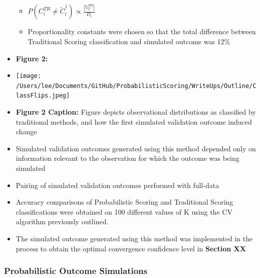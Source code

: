 \documentclass[12pt,]{article}
\providecommand{\tightlist}{%
  \setlength{\itemsep}{0pt}\setlength{\parskip}{0pt}}
\begin{document}
\begin{itemize}
  \begin{itemize}
  \tightlist
  \item
    \(P\left(C_{i}^{TR} \neq \tilde{C}_{i}^{1} \right) \propto \frac{|\mathbb{S}^{PR}_{T}|}{D_{i}}\)
  \item
    Proportionality constants were chosen so that the total difference
    between Traditional Scoring classification and simulated outcome was
    12\%
  \end{itemize}
\item
  \textbf{Figure 2:}
\item
  \texttt{[image: /Users/lee/Documents/GitHub/ProbabilisticScoring/WriteUps/Outline/ClassFlips.jpeg]}
\item
  \textbf{Figure 2 Caption:} Figure depicts observational distributions
  as classified by traditional methods, and how the first simulated
  validation outcome induced change
\item
  Simulated validation outcomes generated using this method depended
  only on information relevant to the observation for which the outcome
  was being simulated
\item
  Pairing of simulated validation outcomes performed with full-data
\item
  Accuracy comparisons of Probabilistic Scoring and Traditional Scoring
  classifications were obtained on 100 different values of K using the
  CV algorithm previously outlined.
\item
  The simulated outcome generated using this method was implemented in
  the process to obtain the optimal convergence confidence level in
  \textbf{Section XX}
\end{itemize}

\hypertarget{probabilistic-outcome-simulations}{%
\subsubsection{Probabilistic Outcome
Simulations}\label{probabilistic-outcome-simulations}}
\end{document}
